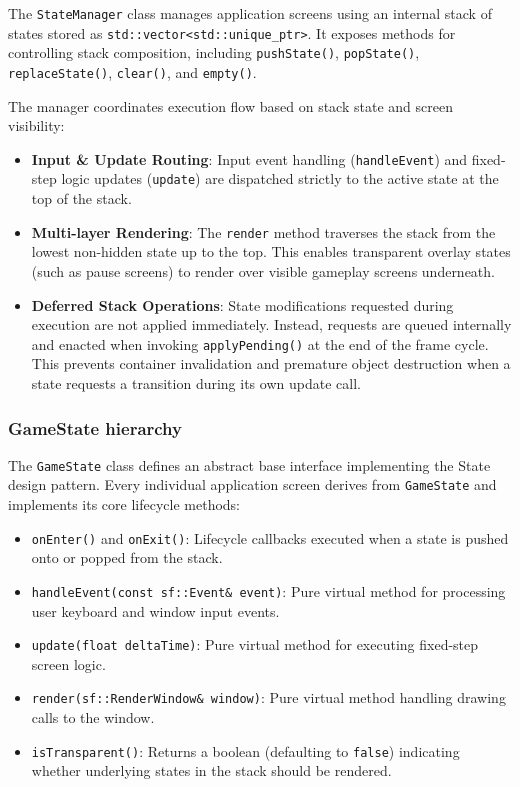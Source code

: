 \documentclass[12pt, a4paper]{article}
\begin{document}
The \texttt{StateManager} class manages application screens using an internal stack of states stored as \texttt{std::vector<std::unique\_ptr>}. It exposes methods for controlling stack composition, including \texttt{pushState()}, \texttt{popState()}, \texttt{replaceState()}, \texttt{clear()}, and \texttt{empty()}.

The manager coordinates execution flow based on stack state and screen visibility:
\begin{itemize}
\item \textbf{Input \& Update Routing}: Input event handling (\texttt{handleEvent}) and fixed-step logic updates (\texttt{update}) are dispatched strictly to the active state at the top of the stack.
\item \textbf{Multi-layer Rendering}: The \texttt{render} method traverses the stack from the lowest non-hidden state up to the top. This enables transparent overlay states (such as pause screens) to render over visible gameplay screens underneath.
\item \textbf{Deferred Stack Operations}: State modifications requested during execution are not applied immediately. Instead, requests are queued internally and enacted when invoking \texttt{applyPending()} at the end of the frame cycle. This prevents container invalidation and premature object destruction when a state requests a transition during its own update call.
\end{itemize}

\subsubsection{GameState hierarchy}

The \texttt{GameState} class defines an abstract base interface implementing the State design pattern. Every individual application screen derives from \texttt{GameState} and implements its core lifecycle methods:
\begin{itemize}
\item \texttt{onEnter()} and \texttt{onExit()}: Lifecycle callbacks executed when a state is pushed onto or popped from the stack.
\item \texttt{handleEvent(const sf::Event\& event)}: Pure virtual method for processing user keyboard and window input events.
\item \texttt{update(float deltaTime)}: Pure virtual method for executing fixed-step screen logic.
\item \texttt{render(sf::RenderWindow\& window)}: Pure virtual method handling drawing calls to the window.
\item \texttt{isTransparent()}: Returns a boolean (defaulting to \texttt{false}) indicating whether underlying states in the stack should be rendered.
\end{itemize}
\end{document}
